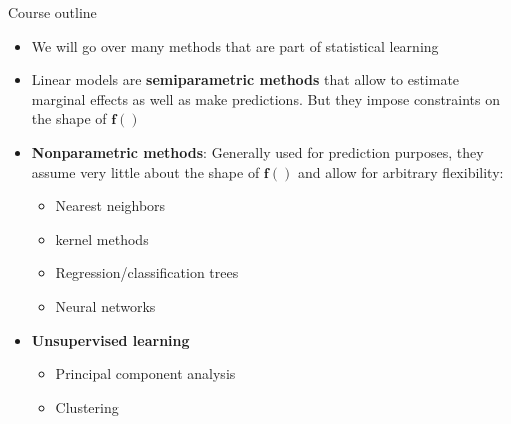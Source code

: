 \documentclass[
  ignorenonframetext,
  aspectratio=169]{beamer}
\providecommand{\tightlist}{%
  \setlength{\itemsep}{0pt}\setlength{\parskip}{0pt}}
\begin{document}
\begin{frame}{Course outline}
\protect\hypertarget{course-outline}{}
\begin{itemize}
\tightlist
\item
  We will go over many methods that are part of statistical learning
\item
  Linear models are \textbf{semiparametric methods} that allow to
  estimate marginal effects as well as make predictions. But they impose
  constraints on the shape of \(\bm{f()}\)
\item
  \textbf{Nonparametric methods}: Generally used for prediction
  purposes, they assume very little about the shape of \(\bm{f()}\) and
  allow for arbitrary flexibility:

  \begin{itemize}
  \tightlist
  \item
    Nearest neighbors
  \item
    kernel methods
  \item
    Regression/classification trees
  \item
    Neural networks
  \end{itemize}
\item
  \textbf{Unsupervised learning}

  \begin{itemize}
  \tightlist
  \item
    Principal component analysis
  \item
    Clustering
  \end{itemize}
\end{itemize}
\end{frame}
\end{document}
